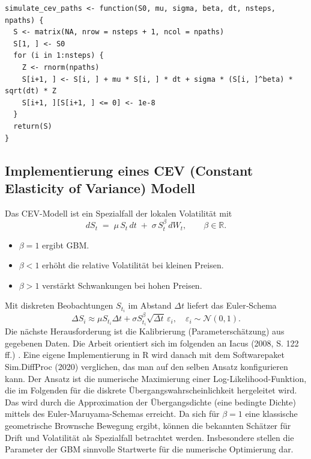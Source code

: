 \begin{lstlisting}
simulate_cev_paths <- function(S0, mu, sigma, beta, dt, nsteps, npaths) {
  S <- matrix(NA, nrow = nsteps + 1, ncol = npaths)
  S[1, ] <- S0
  for (i in 1:nsteps) {
    Z <- rnorm(npaths)
    S[i+1, ] <- S[i, ] + mu * S[i, ] * dt + sigma * (S[i, ]^beta) * sqrt(dt) * Z
    S[i+1, ][S[i+1, ] <= 0] <- 1e-8
  }
  return(S)
}
\end{lstlisting}

\subsection{Implementierung eines CEV (Constant Elasticity of Variance) Modell}
Das CEV-Modell ist ein Spezialfall der lokalen Volatilität mit
$$
dS_t \;=\; \mu\,S_t\,dt \;+\; \sigma\,S_t^{\beta}\,dW_t,\qquad \beta\in\mathbb R.
$$
\begin{itemize}
\item $\beta=1$ ergibt GBM. 
\item $\beta<1$ erhöht die relative Volatilität bei kleinen Preisen.
\item $\beta>1$ verstärkt Schwankungen bei hohen Preisen.
\end{itemize}
Mit diskreten Beobachtungen $S_{t_i}$ im Abstand $\Delta t$ liefert das Euler‑Schema
$$
\Delta S_i \approx \mu S_{t_i}\Delta t + \sigma S_{t_i}^{\beta}\sqrt{\Delta t}\,\varepsilon_i,\quad \varepsilon_i\sim\mathcal N(0,1).
$$
Die nächste Herausforderung ist die Kalibrierung (Parameterschätzung) aus gegebenen Daten. Die Arbeit 
orientiert sich im folgenden an Iacus (2008, S. 122 ff.) \cite{iacus2008}. Eine eigene Implementierung in
R wird danach mit dem Softwarepaket Sim.DiffProc \cite{rsde} (2020) verglichen, das man auf den selben Ansatz konfigurieren kann.
Der Ansatz ist die numerische Maximierung einer Log-Likelihood-Funktion, die im Folgenden für die diskrete Übergangswahrscheinlichkeit hergeleitet wird.
Das wird durch die Approximation der Übergangsdichte (eine bedingte Dichte) mittels des Euler-Maruyama-Schemas erreicht. Da sich für $\beta=1$ eine klassische geometrische Brownsche Bewegung ergibt, 
können die bekannten Schätzer für Drift und Volatilität als Spezialfall betrachtet werden. Insbesondere stellen die Parameter der GBM 
sinnvolle Startwerte für die numerische Optimierung dar.

